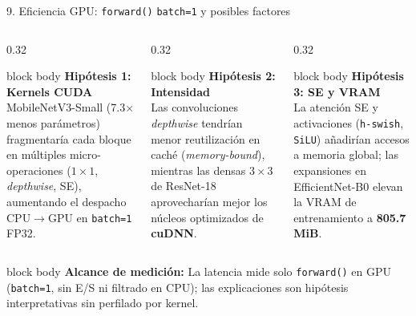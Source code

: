\documentclass[aspectratio=169,10pt,xcolor=table]{beamer}
\begin{document}
\begin{frame}{9. Eficiencia GPU: \texttt{forward()} \texttt{batch=1} y posibles factores}
  \vspace{0.22cm}
  \begin{columns}[T,onlytextwidth]
    \begin{column}{0.32\textwidth}
      \begin{beamercolorbox}[wd=\linewidth,sep=6pt]{block body}
        {\footnotesize\bfseries\color{azulInst}Hipótesis 1: Kernels CUDA}\\[3pt]
        \scriptsize
        MobileNetV3-Small (7.3$\times$ menos parámetros) fragmentaría cada bloque en múltiples micro-operaciones ($1\times 1$, \emph{depthwise}, SE), aumentando el despacho CPU$\to$GPU en \texttt{batch=1} FP32.
      \end{beamercolorbox}
    \end{column}
    \begin{column}{0.32\textwidth}
      \begin{beamercolorbox}[wd=\linewidth,sep=6pt]{block body}
        {\footnotesize\bfseries\color{azulInst}Hipótesis 2: Intensidad}\\[3pt]
        \scriptsize
        Las convoluciones \emph{depthwise} tendrían menor reutilización en caché (\emph{memory-bound}), mientras las densas $3\times 3$ de ResNet-18 aprovecharían mejor los núcleos optimizados de \textbf{cuDNN}.
      \end{beamercolorbox}
    \end{column}
    \begin{column}{0.32\textwidth}
      \begin{beamercolorbox}[wd=\linewidth,sep=6pt]{block body}
        {\footnotesize\bfseries\color{azulInst}Hipótesis 3: SE y VRAM}\\[3pt]
        \scriptsize
        La atención SE y activaciones (\texttt{h-swish}, \texttt{SiLU}) añadirían accesos a memoria global; las expansiones en EfficientNet-B0 elevan la VRAM de entrenamiento a \textbf{805.7 MiB}.
      \end{beamercolorbox}
    \end{column}
  \end{columns}

  \vspace{0.20cm}
  \begin{beamercolorbox}[wd=\linewidth,sep=5pt]{block body}
    \centering\scriptsize
    \textbf{\color{azulInst}Alcance de medición:} La latencia mide solo \texttt{forward()} en GPU (\texttt{batch=1}, sin E/S ni filtrado en CPU); las explicaciones son hipótesis interpretativas sin perfilado por kernel.
  \end{beamercolorbox}
\end{frame}
\end{document}
